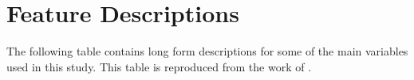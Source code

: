 %
%
%
%

\chapter{Feature Descriptions}\label{C.Appendix1}
{The following table contains long form descriptions for some of the main variables used in this study. This table is reproduced from the work of \cite{moldovan2015learning}. }


